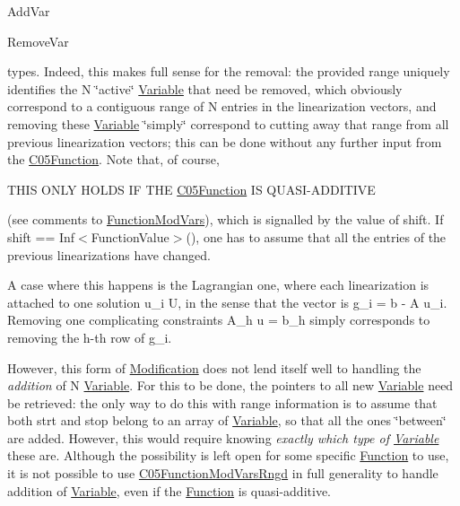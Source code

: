 \begin{DoxyItemize}
\item Add\+Var
\item Remove\+Var

types. Indeed, this makes full sense for the removal\+: the provided range uniquely identifies the N \char`\"{}active\char`\"{} \mbox{\hyperlink{class_s_m_spp__di__unipi__it_1_1_variable}{Variable}} that need be removed, which obviously correspond to a contiguous range of N entries in the linearization vectors, and removing these \mbox{\hyperlink{class_s_m_spp__di__unipi__it_1_1_variable}{Variable}} \char`\"{}simply\char`\"{} correspond to cutting away that range from all previous linearization vectors; this can be done without any further input from the \mbox{\hyperlink{class_s_m_spp__di__unipi__it_1_1_c05_function}{C05\+Function}}. Note that, of course,

T\+H\+IS O\+N\+LY H\+O\+L\+DS IF T\+HE \mbox{\hyperlink{class_s_m_spp__di__unipi__it_1_1_c05_function}{C05\+Function}} IS Q\+U\+A\+S\+I-\/\+A\+D\+D\+I\+T\+I\+VE

(see comments to \mbox{\hyperlink{class_s_m_spp__di__unipi__it_1_1_function_mod_vars}{Function\+Mod\+Vars}}), which is signalled by the value of shift. If shift == Inf$<$\+Function\+Value$>$(), one has to assume that all the entries of the previous linearizations have changed.

A case where this happens is the Lagrangian one, where each linearization is attached to one solution u\+\_\+i  U, in the sense that the vector is g\+\_\+i = b -\/ A u\+\_\+i. Removing one complicating constraints A\+\_\+h u = b\+\_\+h simply corresponds to removing the h-\/th row of g\+\_\+i.

However, this form of \mbox{\hyperlink{class_s_m_spp__di__unipi__it_1_1_modification}{Modification}} does not lend itself well to handling the {\itshape addition} of N \mbox{\hyperlink{class_s_m_spp__di__unipi__it_1_1_variable}{Variable}}. For this to be done, the pointers to all new \mbox{\hyperlink{class_s_m_spp__di__unipi__it_1_1_variable}{Variable}} need be retrieved\+: the only way to do this with range information is to assume that both strt and stop belong to an array of \mbox{\hyperlink{class_s_m_spp__di__unipi__it_1_1_variable}{Variable}}, so that all the ones \char`\"{}between\char`\"{} are added. However, this would require knowing {\itshape exactly which type of \mbox{\hyperlink{class_s_m_spp__di__unipi__it_1_1_variable}{Variable}}} these are. Although the possibility is left open for some specific \mbox{\hyperlink{class_s_m_spp__di__unipi__it_1_1_function}{Function}} to use, it is not possible to use \mbox{\hyperlink{class_s_m_spp__di__unipi__it_1_1_c05_function_mod_vars_rngd}{C05\+Function\+Mod\+Vars\+Rngd}} in full generality to handle addition of \mbox{\hyperlink{class_s_m_spp__di__unipi__it_1_1_variable}{Variable}}, even if the \mbox{\hyperlink{class_s_m_spp__di__unipi__it_1_1_function}{Function}} is quasi-\/additive. 
\end{DoxyItemize}


